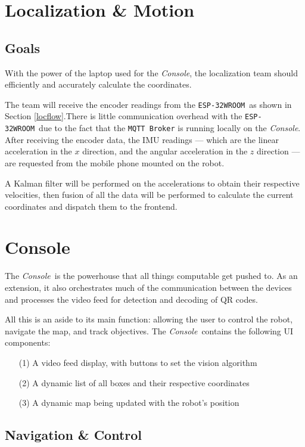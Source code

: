 \documentclass[a4paper,12pt]{article}
\newcommand{\esp}{\texttt{ESP-32WROOM}}
\newcommand{\con}{\textit{Console}}
\begin{document}
\section{Localization \& Motion}
\subsection*{Goals}

With the power of the laptop used for the \con, the localization team should efficiently and accurately calculate the coordinates.

The team will receive the encoder readings from the \esp\ as shown in Section \ref{locflow}.There is little communication overhead with the \esp\ due to the fact that the \texttt{MQTT Broker} is running locally on the \con.
After receiving the encoder data, the IMU readings --- which are the linear acceleration in the $x$ direction, and the angular acceleration in the $z$ direction --- are requested from the mobile phone mounted on the robot.

A Kalman filter will be performed on the accelerations to obtain their respective velocities, then fusion of all the data will be performed to calculate the current coordinates and dispatch them to the frontend.
\section{Console}

The \con\ is the powerhouse that all things computable get pushed to. As an extension, it also orchestrates much of the communication between the devices and processes the video feed for detection and decoding of QR codes.

All this is an aside to its main function: allowing the user to control the robot, navigate the map, and track objectives.
The \con\ contains the following UI components:
\begin{itemize}
    \item[(1)] A video feed display, with buttons to set the vision algorithm
    \item[(2)] A dynamic list of all boxes and their respective coordinates
    \item[(3)] A dynamic map being updated with the robot's position
\end{itemize}
\subsection{Navigation \& Control}
\end{document}
